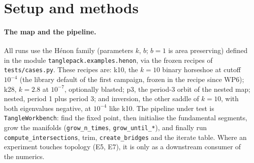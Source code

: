 \documentclass[11pt,a4paper]{article}
\newcommand{\code}[1]{\texttt{#1}}
\begin{document}
\section{Setup and methods}
\label{sec:setup}

\paragraph{The map and the pipeline.} All runs use the Hénon family
(parameters $k$, $b$; $b=1$ is area preserving) defined in the module
\code{tanglepack.examples.henon}, via the frozen recipes of \code{tests/cases.py}. These
recipes are: k10, the $k=10$ binary horseshoe at cutoff $10^{-4}$ (the
library default of the first campaign, frozen in the recipe since WP6); k28,
$k=2.8$ at $10^{-7}$, optionally blasted; p3, the period-3 orbit of the
nested map; nested, period 1 plus period 3; and inversion, the other saddle
of $k=10$, with both eigenvalues negative, at $10^{-4}$ like k10. The pipeline under
test is \code{TangleWorkbench}: find the fixed point, then initialise the
fundamental segments, grow the manifolds (\code{grow\_n\_times},
\code{grow\_until\_*}), and finally run \code{compute\_intersections}, trim,
\code{create\_bridges} and the iterate table. Where an experiment touches
topology (E5, E7), it is only as a downstream consumer of the numerics.
\end{document}
